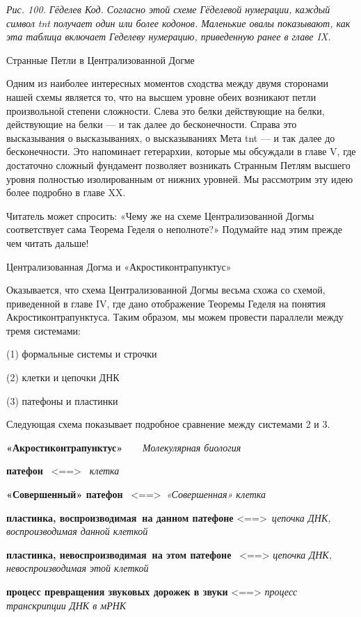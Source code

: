\documentclass[../main.tex]{subfiles}
\begin{document}
\emph{Рис. 100. Гёделев Код. Согласно этой схеме Гёделевой нумерации, каждый символ \acs{tnt} получает один или более кодонов. Маленькие овалы показывают, как эта таблица включает Геделеву нумерацию, приведенную ранее в главе IX.}

Странные Петли в Централизованной Догме

Одним из наиболее интересных моментов сходства между двумя сторонами нашей схемы является то, что на высшем уровне обеих возникают петли произвольной степени сложности. Слева это белки действующие на белки, действующие на белки --- и так далее до бесконечности. Справа это высказывания о высказываниях, о высказываниях Мета \acs{tnt} --- и так далее до бесконечности. Это напоминает гетерархии, которые мы обсуждали в главе V, где достаточно сложный фундамент позволяет возникать Странным Петлям высшего уровня полностью изолированным от нижних уровней. Мы рассмотрим эту идею более подробно в главе XX.

Читатель может спросить: «Чему же на схеме Централизованной Догмы соответствует сама Теорема Геделя о неполноте?» Подумайте над этим прежде чем читать дальше!

Централизованная Догма и «Акростиконтрапунктус»

Оказывается, что схема Централизованной Догмы весьма схожа со схемой, приведенной в главе IV, где дано отображение Теоремы Геделя на понятия Акростиконтрапунктуса. Таким образом, мы можем провести параллели между тремя системами:

(1) формальные системы и строчки

(2) клетки и цепочки ДНК

(3) патефоны и пластинки

Следующая схема показывает подробное сравнение между системами 2 и 3.

\textbf{«Акростиконтрапунктус»~~~} \emph{Молекулярная биология}

\textbf{патефон} ~\textless==\textgreater~ \emph{клетка}

\textbf{«Совершенный» патефон} ~\textless==\textgreater~\emph{«Совершенная» клетка}

\textbf{пластинка, воспроизводимая~на данном патефоне} \textless==\textgreater~\emph{цепочка ДНК, воспроизводимая данной клеткой}

\textbf{пластинка, невоспроизводимая~на этом патефоне} ~\textless==\textgreater{} \emph{цепочка ДНК, невоспроизводимая этой клеткой}

\textbf{процесс превращения звуковых дорожек в звуки} \textless==\textgreater{} \emph{процесс транскрипции ДНК в мРНК}
\end{document}
